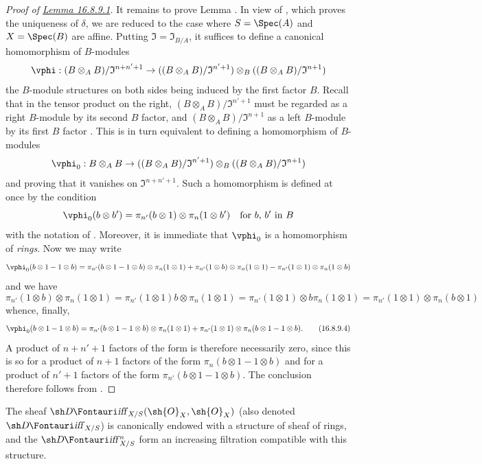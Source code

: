 \begin{proof}[Proof of {\hyperlink{ega4.c04.lem.16-8-9-1}{Lemma 16.8.9.1}}]
It remains to prove Lemma .
In view of , which proves the uniqueness of $\delta$, we are reduced to the case where $S = \Spec(A)$ and $X = \Spec(B)$ are affine.
Putting $\mathfrak{I} = \mathfrak{I}_{B/A}$, it suffices to define a canonical homomorphism of $B$-modules
\[
  \vphi: (B \otimes_A B)/\mathfrak{I}^{n+n'+1} \to ((B \otimes_A B)/\mathfrak{I}^{n' + 1}) \otimes_B ((B \otimes_A B)/\mathfrak{I}^{n + 1})
\]
the $B$-module structures on both sides being induced by the first factor $B$.
Recall that in the tensor product on the right, $(B \otimes_A B)/\mathfrak{I}^{n' + 1}$ must be regarded
as a right $B$-module by its second $B$ factor, and $(B \otimes_A B)/\mathfrak{I}^{n + 1}$ as a left $B$-module by its first $B$ factor .
This is in turn equivalent to defining a homomorphism of $B$-modules
\[
  \vphi_0: B \otimes_A B \to ((B \otimes_A B)/\mathfrak{I}^{n' + 1}) \otimes_B ((B \otimes_A B)/\mathfrak{I}^{n + 1})
\]
and proving that it vanishes on $\mathfrak{I}^{n+n'+1}$.
Such a homomorphism is defined at once by the condition
\[
  \vphi_0(b \otimes b') = \pi_{n'}(b \otimes 1) \otimes \pi_n(1 \otimes b') \quad \text{for $b$, $b'$ in $B$}
\]
with the notation of .
Moreover, it is immediate that $\vphi_0$ is a homomorphism of \emph{rings}.
Now we may write
\[
  \vphi_0(b \otimes 1 - 1 \otimes b) = \pi_{n'}(b \otimes 1 - 1 \otimes b) \otimes \pi_n(1 \otimes 1) + \pi_{n'}(1 \otimes b) \otimes \pi_n(1 \otimes 1) - \pi_{n'}(1 \otimes 1) \otimes \pi_n(1 \otimes b)
\]
and we have 
\[
  \pi_{n'}(1 \otimes b) \otimes \pi_n(1 \otimes 1) = \pi_{n'}(1 \otimes 1) b \otimes \pi_n(1 \otimes 1) = \pi_{n'}(1 \otimes 1) \otimes b \pi_n(1 \otimes 1) = \pi_{n'}(1 \otimes 1) \otimes \pi_n(b \otimes 1)
\]
whence, finally,
\[
  \label{IV.16.8.9.4}
  \vphi_0(b \otimes 1 - 1 \otimes b) = \pi_{n'}(b \otimes 1 - 1 \otimes b) \otimes \pi_n(1 \otimes 1) + \pi_{n'}(1 \otimes 1) \otimes \pi_n(b \otimes 1 - 1 \otimes b). 
  \tag{16.8.9.4}
\]
A product of $n + n' + 1$ factors of the form  is therefore necessarily zero, since this is so for a product of $n+1$ factors of the form $\pi_n(b \otimes 1 - 1 \otimes b)$ and for a product of $n' + 1$ factors of the form $\pi_{n'}(b \otimes 1 - 1 \otimes b)$.
The conclusion therefore follows from .
\end{proof}

\begin{corollary}[16.8.10]
\label{IV.16.8.10}
The sheaf $\shDiff_{X/S}(\sh{O}_X, \sh{O}_X)$ (also denoted $\shDiff_{X/S}$) is canonically endowed with a structure of sheaf of rings, and the $\shDiff_{X/S}^n$ form an increasing filtration compatible with this structure.
\end{corollary}

